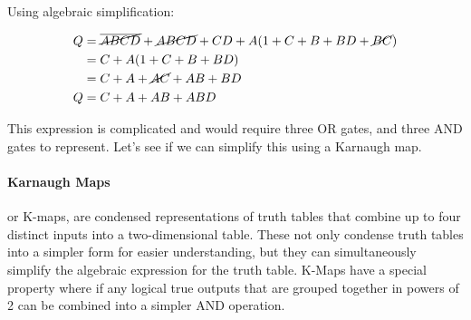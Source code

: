     Using algebraic simplification:

    \begin{align}
        Q &= \cancel{\overline{ABCD}} + \cancel{ABCD} + CD + A(1 + C + B + BD + \cancel{BC}) \nonumber \\
          &= C + A(1 + C + B + BD) \nonumber \\
          &= C + A + \cancel{AC} + AB + BD \nonumber \\
        Q &= C + A + AB + ABD \nonumber
    \end{align}


    This expression is complicated and would require three OR gates, and three AND gates to represent.
    Let's see if we can simplify this using a Karnaugh map.

    \paragraph*{Karnaugh Maps} or K-maps, are condensed representations of truth tables that combine up to four distinct inputs into a two-dimensional table.
    These not only condense truth tables into a simpler form for easier understanding, but they can simultaneously simplify the algebraic expression for the truth table.
    K-Maps have a special property where if any logical true outputs that are grouped together in powers of 2 can be combined into a simpler AND operation.

